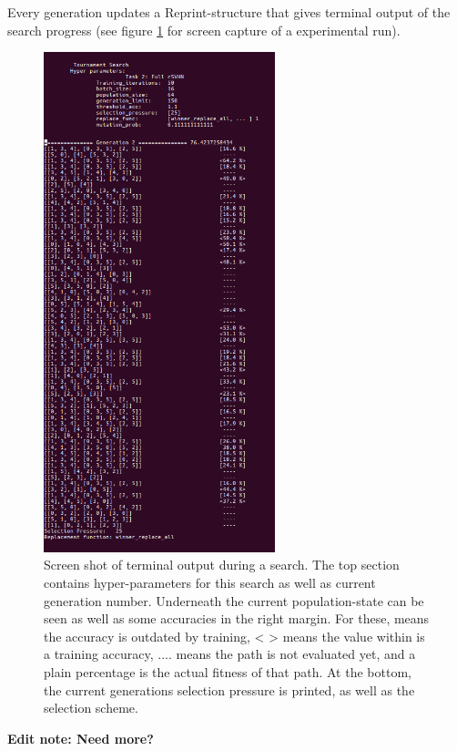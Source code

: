 Every generation updates a Reprint-structure that gives terminal output of the search progress (see figure \ref{fig:searchoutput} for screen capture of a experimental run).
\begin{figure}[ht]
    \centering
    \includegraphics[width=0.6\textwidth]{Chapters/3.Implementation/figures/search_output.png}
    \caption[Terminal search output]{Screen shot of terminal output during a search. The top section contains hyper-parameters for this search as well as current generation number. Underneath the current population-state can be seen as well as some accuracies in the right margin. For these, \big[ \big] means the accuracy is outdated by training, \big< \big> means the value within is a training accuracy, .... means the path is not evaluated yet, and a plain percentage is the actual fitness of that path. At the bottom, the current generations selection pressure is printed, as well as the selection scheme.}
    \label{fig:searchoutput}
\end{figure}
\textbf{Edit note: Need more?}

